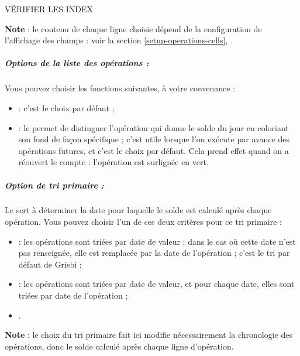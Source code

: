 VÉRIFIER LES INDEX

\textbf{Note} : le contenu de chaque ligne choisie dépend de la configuration de l'affichage des champs : voir la section \vref{setup-operations-cells}, .



\subparagraph{Options de la liste des opérations :}

Vous pouvez choisir les fonctions suivantes, à votre convenance :
\begin{itemize}
	\item {} : c'est le choix par défaut ;
	\item {} : le  permet de distinguer l'opération qui donne le solde du jour en coloriant son fond de façon spécifique ; c'est utile lorsque l'on exécute par avance des opérations futures, et c'est le choix par défaut. Cela prend effet quand on a réouvert le compte : l'opération est surlignée en vert{\couleur}.
\end{itemize}


\subparagraph{Option de tri primaire :}

Le  sert à déterminer la date pour laquelle le  solde est calculé après chaque opération. Vous pouvez choisir l'un de ces deux critères pour ce tri primaire :

\begin{itemize}
	\item {} : les opérations sont triées par date de valeur ; dans le cas où cette date n'est pas renseignée, elle est remplacée par la date de l'opération ; c'est le \gls{tri} par défaut de Grisbi ;
	\item {} : les opérations sont triées par date de valeur, et pour chaque date, elles sont triées par date de l'opération ;
	\item {}. 
\end{itemize}

\textbf{Note} : le choix du tri primaire fait ici modifie nécessairement la chronologie des opérations, donc le solde calculé après chaque ligne d'opération.

